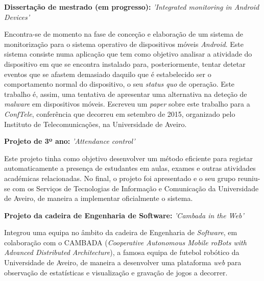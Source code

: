 \documentclass[11pt,a4paper,sans]{moderncv} %
\begin{document}
\begin{itemize}

\item{\textbf{Dissertação de mestrado (em progresso): } \textit{'Integrated
      monitoring in Android Devices'}

\vspace{3pt}

\small{Encontra-se de momento na fase de conceção e elaboração de um sistema de
  monitorização para o sistema operativo de dispositivos móveis
  \textit{Android}. Este sistema consiste numa aplicação que tem como objetivo
  analisar a atividade do dispositivo em que se encontra instalado para,
  posteriormente, tentar detetar eventos que se afastem demasiado daquilo que é
  estabelecido ser o comportamento normal do dispositivo, o seu \textit{status
    quo} de operação. Este trabalho é, assim, uma tentativa de apresentar uma
  alternativa na deteção de \textit{malware} em dispositivos móveis. Escreveu um
  \textit{paper} sobre este trabalho para a \textit{ConfTele}, conferência que
  decorreu em setembro de 2015, organizado pelo Instituto de Telecomunicações,
  na Universidade de Aveiro.}

\item{\textbf{Projeto de 3º ano: } \textit{'Attendance control'}

\vspace{3pt}

\small{Este projeto tinha como objetivo desenvolver um método eficiente para
  registar automaticamente a presença de estudantes em aulas, exames e outras
  atividades académicas relacionadas. No final, o projeto foi apresentado e o
  seu grupo reuniu-se com os Serviços de Tecnologias de Informação e Comunicação
  da Universidade de Aveiro, de maneira a implementar oficialmente o sistema.}}

\vspace{6pt}

\item{\textbf{Projeto da cadeira de Engenharia de Software: }\textit{'Cambada
      in the Web'}}

\vspace{3pt}

\small{Integrou uma equipa no âmbito da cadeira de Engenharia de
  \textit{Software}, em colaboração com o CAMBADA (\textit{Cooperative
    Autonomous Mobile roBots with Advanced Distributed Architecture}), a famosa
  equipa de futebol robótico da Universidade de Aveiro, de maneira a desenvolver
  uma plataforma \textit{web} para observação de estatísticas e visualização e
  gravação de jogos a decorrer.}}


\end{itemize}
\end{document}
